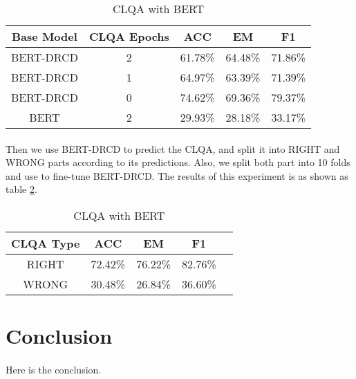 \documentclass{article}
\begin{document}
\begin{table}[h!]
  \centering
  \caption{CLQA with BERT}
  \begin{tabular}{ccccc}
    Base Model & CLQA Epochs & ACC & EM & F1\\
    \toprule
    BERT-DRCD & 2 & 61.78\% & 64.48\% & 71.86\% \\
    BERT-DRCD & 1 & 64.97\% & 63.39\% & 71.39\% \\
    BERT-DRCD & 0 & 74.62\% & 69.36\% & 79.37\% \\
    BERT      & 2 & 29.93\% & 28.18\% & 33.17\% \\
  \end{tabular}
  \label{tab:bert-clqa}
\end{table}

\paragraph{}
Then we use BERT-DRCD to predict the CLQA, and split it into RIGHT and WRONG parts according to its predictions. Also, we split both part into 10 folds and use to fine-tune BERT-DRCD. The results of this experiment is as shown as table \ref{tab:bert-clqa-right-wrong}.

\begin{table}[h!]
  \centering
  \caption{CLQA with BERT}
  \begin{tabular}{ccccc}
    CLQA Type & ACC & EM & F1\\
    \toprule
    RIGHT & 72.42\% & 76.22\% & 82.76\% \\
    WRONG & 30.48\% & 26.84\% & 36.60\% \\
  \end{tabular}
  \label{tab:bert-clqa-right-wrong}
\end{table}

\section{Conclusion}
\paragraph{}
Here is the conclusion.



\end{document}
